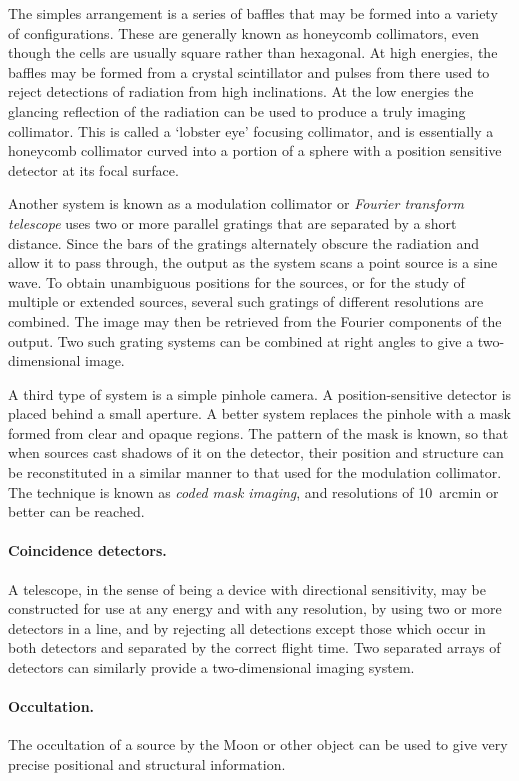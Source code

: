 The simples arrangement is a series of baffles that may be formed into a variety of configurations. These are generally known as honeycomb collimators, even though the cells are
usually square rather than hexagonal. At high energies, the baffles may be formed from 
a crystal scintillator and pulses from there used to reject detections of radiation from
high inclinations. At the low energies the glancing reflection of the radiation can be used
to produce a truly imaging collimator. This is called a `lobster eye' focusing collimator, 
and is essentially a honeycomb collimator curved into a portion of a sphere with a position 
sensitive detector at its focal surface. 

Another system is known as a modulation collimator
or {\it Fourier transform telescope} uses two or more parallel gratings that are separated by
a short distance. Since the bars of the gratings alternately obscure the radiation and allow it to 
pass through, the output as the system scans a point source is a sine wave. To obtain 
unambiguous positions for the sources, or for the study of multiple or extended sources, 
several such gratings of different resolutions are combined. The image may then be 
retrieved from the Fourier components of the output. Two such grating systems can be
combined at right angles to give a two-dimensional image. 

A third type of system is a simple pinhole camera. A position-sensitive detector is placed 
behind a small aperture. A better system replaces the pinhole with a mask formed from 
clear and opaque regions. The pattern of the mask is known, so that when sources cast 
shadows of it on the detector, their position and structure can be reconstituted in a similar
manner to that used for the modulation collimator. The technique is known as {\it coded 
mask imaging}, and resolutions of 10~arcmin or better can be reached. 

\paragraph{Coincidence detectors.} A telescope, in the sense of being a device with directional sensitivity, may be constructed for use at any energy and with any resolution, by using two
or more detectors in a line, and by rejecting all detections except those which occur in 
both detectors and separated by the correct flight time. Two separated arrays of detectors 
can similarly provide a two-dimensional imaging system.

\paragraph{Occultation.} The occultation of a source by the Moon or other object can be used to 
give very precise positional and structural information.

